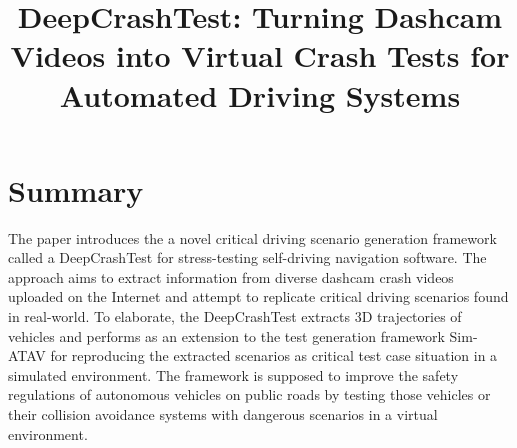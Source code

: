 \documentclass[10pt,a4paper]{report}
\title{DeepCrashTest: Turning Dashcam Videos into Virtual Crash Tests for Automated Driving Systems}
\begin{document}
\begin{center}
\textbf{\thetitle}
\end{center}


\section{Summary}
The paper introduces the a novel critical driving scenario generation framework called a DeepCrashTest for stress-testing self-driving navigation software.
%
The approach aims to extract information from diverse dashcam crash videos uploaded on the Internet and attempt to replicate critical driving scenarios found in real-world.
%
To elaborate, the DeepCrashTest extracts 3D trajectories of vehicles and performs as an extension to the test generation framework Sim-ATAV for reproducing the extracted scenarios as critical test case situation in a simulated environment.
%
The framework is supposed to improve the safety regulations of autonomous vehicles on public roads by testing those vehicles or their collision avoidance systems with dangerous scenarios in a virtual environment.
%
\end{document}
